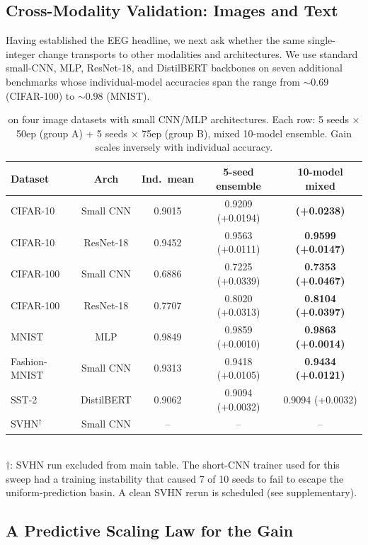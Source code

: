 \subsection{Cross-Modality Validation: Images and Text}
\label{sec:image}

Having established the EEG headline, we next ask whether the same
single-integer change transports to other modalities and architectures.
We use standard small-CNN, MLP, ResNet-18, and DistilBERT backbones on
seven additional benchmarks whose individual-model accuracies span the
range from $\sim\!0.69$ (CIFAR-100) to $\sim\!0.98$ (MNIST).

\begin{table}[h]
\centering
\caption{\ours{} on four image datasets with small CNN/MLP architectures.
Each row: 5 seeds × 50ep (group A) + 5 seeds × 75ep (group B), mixed 10-model
ensemble. Gain scales inversely with individual accuracy.}
\label{tab:image}
\begin{tabular}{lcccc}
\toprule
Dataset & Arch & Ind.\ mean & 5-seed ensemble & \textbf{10-model mixed} \\
\midrule
CIFAR-10 & Small CNN & 0.9015 & 0.9209 (+0.0194) & \textbf{\ciftenacc{} (+0.0238)} \\
CIFAR-10 & ResNet-18 & 0.9452 & 0.9563 (+0.0111) & \textbf{0.9599 (+0.0147)} \\
CIFAR-100 & Small CNN & 0.6886 & 0.7225 (+0.0339) & \textbf{0.7353 (+0.0467)} \\
CIFAR-100 & ResNet-18 & 0.7707 & 0.8020 (+0.0313) & \textbf{0.8104 (+0.0397)} \\
MNIST & MLP & 0.9849 & 0.9859 (+0.0010) & \textbf{0.9863 (+0.0014)} \\
Fashion-MNIST & Small CNN & 0.9313 & 0.9418 (+0.0105) & \textbf{0.9434 (+0.0121)} \\
SST-2 & DistilBERT & 0.9062 & 0.9094 (+0.0032) & 0.9094 (+0.0032) \\
SVHN$^{\dagger}$ & Small CNN & -- & -- & -- \\
\bottomrule
\end{tabular}
\\[0.4em]
{\footnotesize $\dagger$: SVHN run excluded from main table. The short-CNN
trainer used for this sweep had a training instability that caused 7 of
10 seeds to fail to escape the uniform-prediction basin. A clean SVHN
rerun is scheduled (see supplementary).}
\end{table}

\subsection{A Predictive Scaling Law for the Gain}
\label{sec:scaling}

